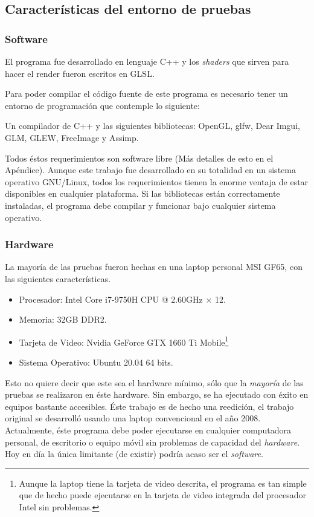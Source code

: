 \subsection{Características del entorno de pruebas}

\subsubsection{Software}

El programa fue desarrollado en lenguaje C++ y los \emph{\textenglish{shaders}} que sirven para hacer el render fueron escritos en GLSL.

Para poder compilar el código fuente de este programa es necesario tener un entorno de programación que contemple lo siguiente:

Un compilador de C++ y las siguientes bibliotecas: OpenGL, glfw, Dear Imgui, GLM, GLEW, FreeImage y Assimp.

Todos éstos requerimientos son software libre (Más detalles de esto en el Apéndice).
Aunque este trabajo fue desarrollado en su totalidad en un sistema operativo GNU/Linux, todos los requerimientos tienen la enorme ventaja de estar disponibles en cualquier plataforma.
Si las bibliotecas están correctamente instaladas, el programa debe compilar y funcionar bajo cualquier sistema operativo.

\subsubsection{Hardware}
La mayoría de las pruebas fueron hechas en una laptop personal MSI GF65, con las siguientes características.

\begin{itemize}
\label{maquina:trabajo} 
 \item Procesador: Intel Core i7-9750H CPU @ 2.60GHz $\times$ 12.
 \item Memoria: 32GB DDR2.
 \item Tarjeta de Video: Nvidia GeForce GTX 1660 Ti Mobile\footnote{Aunque la laptop tiene la tarjeta de video descrita, el programa es tan simple que de hecho puede ejecutarse en la tarjeta de video integrada del procesador Intel sin problemas.}
 \item Sistema Operativo: Ubuntu 20.04 64 bits.
\end{itemize}

Esto no quiere decir que este sea el hardware mínimo, sólo que la \emph{mayoría} de las pruebas se realizaron en éste hardware.
Sin embargo, se ha ejecutado con éxito en equipos bastante accesibles. 
Éste trabajo es de hecho una reedición, el trabajo original se desarrolló usando una laptop convencional en el año 2008.
Actualmente, éste programa debe poder ejecutarse en cualquier computadora personal, de escritorio o equipo móvil sin problemas de capacidad del \emph{\textenglish{hardware}}.
Hoy en día la única limitante (de existir) podría acaso ser el \emph{\textenglish{software}}.

